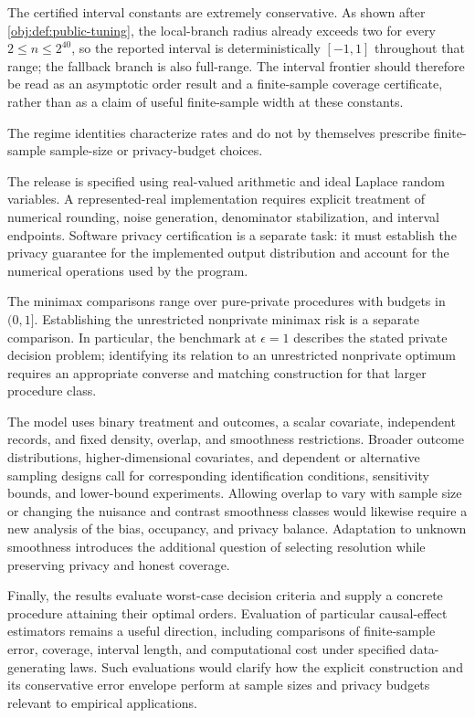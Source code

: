 The certified interval constants are extremely conservative. As shown after \cref{obj:def:public-tuning}, the local-branch radius already exceeds two for every \(2\le n\le2^{40}\), so the reported interval is deterministically \([-1,1]\) throughout that range; the fallback branch is also full-range. The interval frontier should therefore be read as an asymptotic order result and a finite-sample coverage certificate, rather than as a claim of useful finite-sample width at these constants.

The regime identities characterize rates and do not by themselves prescribe finite-sample sample-size or privacy-budget choices.

The release is specified using real-valued arithmetic and ideal Laplace random variables. A represented-real implementation requires explicit treatment of numerical rounding, noise generation, denominator stabilization, and interval endpoints. Software privacy certification is a separate task: it must establish the privacy guarantee for the implemented output distribution and account for the numerical operations used by the program.

The minimax comparisons range over pure-private procedures with budgets in \((0,1]\). Establishing the unrestricted nonprivate minimax risk is a separate comparison. In particular, the benchmark at \(\epsilon=1\) describes the stated private decision problem; identifying its relation to an unrestricted nonprivate optimum requires an appropriate converse and matching construction for that larger procedure class.

The model uses binary treatment and outcomes, a scalar covariate, independent records, and fixed density, overlap, and smoothness restrictions. Broader outcome distributions, higher-dimensional covariates, and dependent or alternative sampling designs call for corresponding identification conditions, sensitivity bounds, and lower-bound experiments. Allowing overlap to vary with sample size or changing the nuisance and contrast smoothness classes would likewise require a new analysis of the bias, occupancy, and privacy balance. Adaptation to unknown smoothness introduces the additional question of selecting resolution while preserving privacy and honest coverage.

Finally, the results evaluate worst-case decision criteria and supply a concrete procedure attaining their optimal orders. Evaluation of particular causal-effect estimators remains a useful direction, including comparisons of finite-sample error, coverage, interval length, and computational cost under specified data-generating laws. Such evaluations would clarify how the explicit construction and its conservative error envelope perform at sample sizes and privacy budgets relevant to empirical applications.
